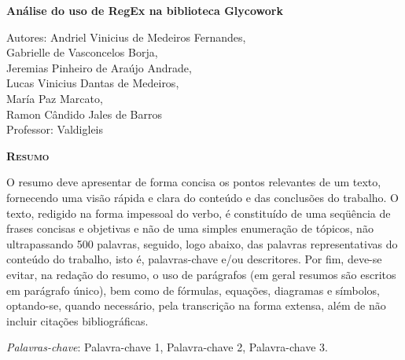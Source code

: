 \begin{center}
	{\Large{\textbf{Análise do uso de RegEx na biblioteca Glycowork}}}
\end{center}

\vspace{1cm}

\begin{flushright}
	Autores: Andriel Vinicius de Medeiros Fernandes, \\
		Gabrielle de Vasconcelos Borja, \\
		Jeremias Pinheiro de Araújo Andrade, \\
		Lucas Vinicius Dantas de Medeiros, \\
		María Paz Marcato, \\
		Ramon Cândido Jales de Barros \\
	Professor: Valdigleis
\end{flushright}

\vspace{1cm}

\begin{center}
	\Large{\textsc{\textbf{Resumo}}}
\end{center}

\noindent O resumo deve apresentar de forma concisa os pontos relevantes de um texto, fornecendo uma visão rápida e clara do conteúdo e das conclusões do trabalho. O texto, redigido na forma impessoal do verbo, é constituído de uma seqüência de frases concisas e objetivas e não de uma simples enumeração de tópicos, não ultrapassando 500 palavras, seguido, logo abaixo, das palavras representativas do conteúdo do trabalho, isto é, palavras-chave e/ou descritores. Por fim, deve-se evitar, na redação do resumo, o uso de parágrafos (em geral resumos são escritos em parágrafo único), bem como de fórmulas, equações, diagramas e símbolos, optando-se, quando necessário, pela transcrição na forma extensa, além de não incluir citações bibliográficas.

\noindent\textit{Palavras-chave}: Palavra-chave 1, Palavra-chave 2, Palavra-chave 3.